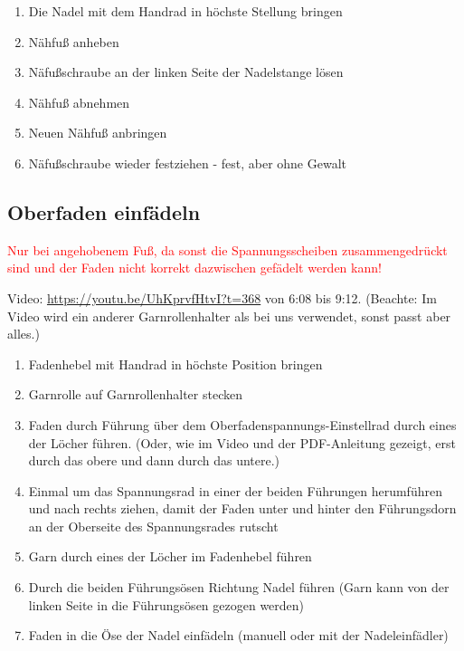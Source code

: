 \documentclass{\basedir/fablab-document}
\begin{document}
\begin{enumerate}
	\item Die Nadel mit dem Handrad in höchste Stellung bringen
	\item Nähfuß anheben
	\item Näfußschraube an der linken Seite der Nadelstange lösen
	\item Nähfuß abnehmen
	\item Neuen Nähfuß anbringen
	\item Näfußschraube wieder festziehen - fest, aber ohne Gewalt
\end{enumerate}

\subsection{Oberfaden einfädeln}
\textcolor{red}{Nur bei angehobenem Fuß, da sonst die Spannungsscheiben zusammengedrückt sind und der Faden nicht korrekt dazwischen gefädelt werden kann!}
\newline

Video: \url{https://youtu.be/UhKprvfHtvI?t=368} von 6:08 bis 9:12. (Beachte: Im Video wird ein anderer Garnrollenhalter als bei uns verwendet, sonst passt aber alles.)

\begin{enumerate}
	\item Fadenhebel mit Handrad in höchste Position bringen
	\item Garnrolle auf Garnrollenhalter stecken
	\item Faden durch Führung über dem Oberfadenspannungs-Einstellrad durch eines der Löcher führen. (Oder, wie im Video und der PDF-Anleitung gezeigt, erst durch das obere und dann durch das untere.)
	\item Einmal um das Spannungsrad in einer der beiden Führungen herumführen und nach rechts ziehen, damit der Faden unter und hinter den Führungsdorn an der Oberseite des Spannungsrades rutscht 
	\item Garn durch eines der Löcher im Fadenhebel führen
	\item Durch die beiden Führungsösen Richtung Nadel führen (Garn kann von der linken Seite in die Führungsösen gezogen werden)
	\item Faden in die Öse der Nadel einfädeln (manuell oder mit der Nadeleinfädler)
\end{enumerate}

\vspace{2em}
\end{document}
